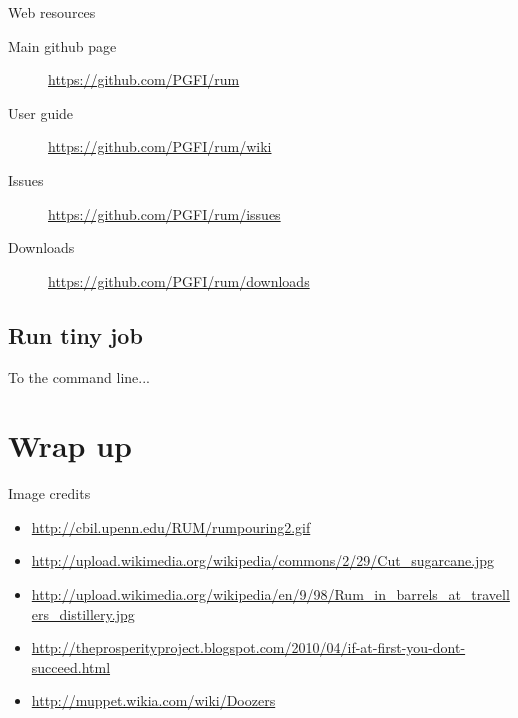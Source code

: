 \documentclass{beamer}
\begin{document}
\begin{frame}{Web resources}
  \begin{description}
    \item [Main github page] 
      \url{https://github.com/PGFI/rum}

    \item [User guide] 
      \url{https://github.com/PGFI/rum/wiki}

    \item [Issues] 
      \url{https://github.com/PGFI/rum/issues}

    \item [Downloads] 
      \url{https://github.com/PGFI/rum/downloads}
    
  \end{description}
\end{frame}

\subsection{Run tiny job}

\begin{frame}
  To the command line...
\end{frame}

\section{Wrap up}

\begin{frame}{Image credits}
  \begin{itemize}
    \item \url{http://cbil.upenn.edu/RUM/rumpouring2.gif}
    \item \url{http://upload.wikimedia.org/wikipedia/commons/2/29/Cut\_sugarcane.jpg}
    \item \url{http://upload.wikimedia.org/wikipedia/en/9/98/Rum\_in\_barrels\_at\_travellers\_distillery.jpg}
    \item \url{http://theprosperityproject.blogspot.com/2010/04/if-at-first-you-dont-succeed.html}
    \item \url{http://muppet.wikia.com/wiki/Doozers}
  \end{itemize}
  
\end{frame}
\end{document}
